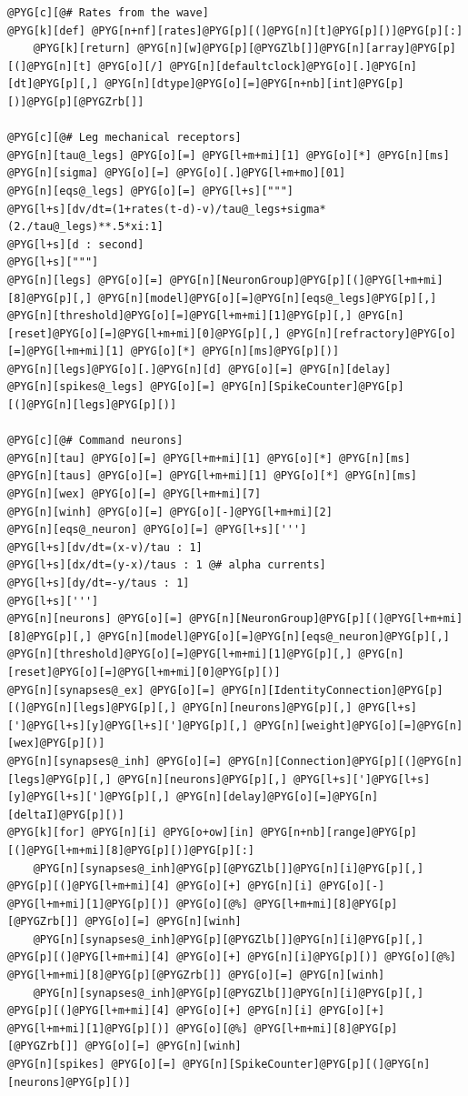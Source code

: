 \documentclass[letterpaper,10pt,english]{manual}
\begin{document}
\begin{Verbatim}[commandchars=@\[\]]
@PYG[c][@# Rates from the wave]
@PYG[k][def] @PYG[n+nf][rates]@PYG[p][(]@PYG[n][t]@PYG[p][)]@PYG[p][:]
    @PYG[k][return] @PYG[n][w]@PYG[p][@PYGZlb[]]@PYG[n][array]@PYG[p][(]@PYG[n][t] @PYG[o][/] @PYG[n][defaultclock]@PYG[o][.]@PYG[n][dt]@PYG[p][,] @PYG[n][dtype]@PYG[o][=]@PYG[n+nb][int]@PYG[p][)]@PYG[p][@PYGZrb[]]

@PYG[c][@# Leg mechanical receptors]
@PYG[n][tau@_legs] @PYG[o][=] @PYG[l+m+mi][1] @PYG[o][*] @PYG[n][ms]
@PYG[n][sigma] @PYG[o][=] @PYG[o][.]@PYG[l+m+mo][01]
@PYG[n][eqs@_legs] @PYG[o][=] @PYG[l+s]["""]
@PYG[l+s][dv/dt=(1+rates(t-d)-v)/tau@_legs+sigma*(2./tau@_legs)**.5*xi:1]
@PYG[l+s][d : second]
@PYG[l+s]["""]
@PYG[n][legs] @PYG[o][=] @PYG[n][NeuronGroup]@PYG[p][(]@PYG[l+m+mi][8]@PYG[p][,] @PYG[n][model]@PYG[o][=]@PYG[n][eqs@_legs]@PYG[p][,] @PYG[n][threshold]@PYG[o][=]@PYG[l+m+mi][1]@PYG[p][,] @PYG[n][reset]@PYG[o][=]@PYG[l+m+mi][0]@PYG[p][,] @PYG[n][refractory]@PYG[o][=]@PYG[l+m+mi][1] @PYG[o][*] @PYG[n][ms]@PYG[p][)]
@PYG[n][legs]@PYG[o][.]@PYG[n][d] @PYG[o][=] @PYG[n][delay]
@PYG[n][spikes@_legs] @PYG[o][=] @PYG[n][SpikeCounter]@PYG[p][(]@PYG[n][legs]@PYG[p][)]

@PYG[c][@# Command neurons]
@PYG[n][tau] @PYG[o][=] @PYG[l+m+mi][1] @PYG[o][*] @PYG[n][ms]
@PYG[n][taus] @PYG[o][=] @PYG[l+m+mi][1] @PYG[o][*] @PYG[n][ms]
@PYG[n][wex] @PYG[o][=] @PYG[l+m+mi][7]
@PYG[n][winh] @PYG[o][=] @PYG[o][-]@PYG[l+m+mi][2]
@PYG[n][eqs@_neuron] @PYG[o][=] @PYG[l+s][''']
@PYG[l+s][dv/dt=(x-v)/tau : 1]
@PYG[l+s][dx/dt=(y-x)/taus : 1 @# alpha currents]
@PYG[l+s][dy/dt=-y/taus : 1]
@PYG[l+s][''']
@PYG[n][neurons] @PYG[o][=] @PYG[n][NeuronGroup]@PYG[p][(]@PYG[l+m+mi][8]@PYG[p][,] @PYG[n][model]@PYG[o][=]@PYG[n][eqs@_neuron]@PYG[p][,] @PYG[n][threshold]@PYG[o][=]@PYG[l+m+mi][1]@PYG[p][,] @PYG[n][reset]@PYG[o][=]@PYG[l+m+mi][0]@PYG[p][)]
@PYG[n][synapses@_ex] @PYG[o][=] @PYG[n][IdentityConnection]@PYG[p][(]@PYG[n][legs]@PYG[p][,] @PYG[n][neurons]@PYG[p][,] @PYG[l+s][']@PYG[l+s][y]@PYG[l+s][']@PYG[p][,] @PYG[n][weight]@PYG[o][=]@PYG[n][wex]@PYG[p][)]
@PYG[n][synapses@_inh] @PYG[o][=] @PYG[n][Connection]@PYG[p][(]@PYG[n][legs]@PYG[p][,] @PYG[n][neurons]@PYG[p][,] @PYG[l+s][']@PYG[l+s][y]@PYG[l+s][']@PYG[p][,] @PYG[n][delay]@PYG[o][=]@PYG[n][deltaI]@PYG[p][)]
@PYG[k][for] @PYG[n][i] @PYG[o+ow][in] @PYG[n+nb][range]@PYG[p][(]@PYG[l+m+mi][8]@PYG[p][)]@PYG[p][:]
    @PYG[n][synapses@_inh]@PYG[p][@PYGZlb[]]@PYG[n][i]@PYG[p][,] @PYG[p][(]@PYG[l+m+mi][4] @PYG[o][+] @PYG[n][i] @PYG[o][-] @PYG[l+m+mi][1]@PYG[p][)] @PYG[o][@%] @PYG[l+m+mi][8]@PYG[p][@PYGZrb[]] @PYG[o][=] @PYG[n][winh]
    @PYG[n][synapses@_inh]@PYG[p][@PYGZlb[]]@PYG[n][i]@PYG[p][,] @PYG[p][(]@PYG[l+m+mi][4] @PYG[o][+] @PYG[n][i]@PYG[p][)] @PYG[o][@%] @PYG[l+m+mi][8]@PYG[p][@PYGZrb[]] @PYG[o][=] @PYG[n][winh]
    @PYG[n][synapses@_inh]@PYG[p][@PYGZlb[]]@PYG[n][i]@PYG[p][,] @PYG[p][(]@PYG[l+m+mi][4] @PYG[o][+] @PYG[n][i] @PYG[o][+] @PYG[l+m+mi][1]@PYG[p][)] @PYG[o][@%] @PYG[l+m+mi][8]@PYG[p][@PYGZrb[]] @PYG[o][=] @PYG[n][winh]
@PYG[n][spikes] @PYG[o][=] @PYG[n][SpikeCounter]@PYG[p][(]@PYG[n][neurons]@PYG[p][)]


\end{Verbatim}
\end{document}
